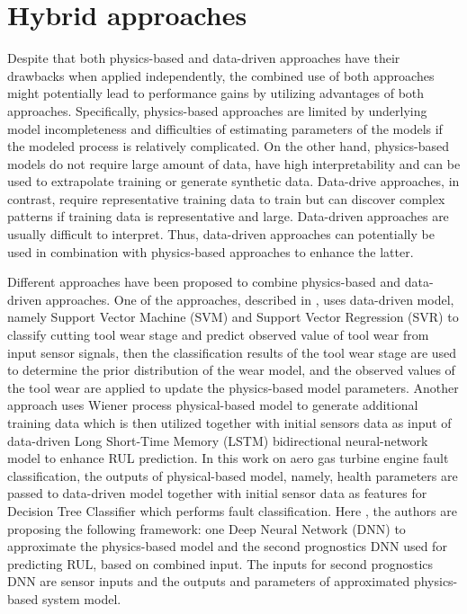 \section{Hybrid approaches}
Despite that both physics-based and data-driven approaches have their drawbacks when applied independently, the combined use of both approaches might potentially lead to performance gains by utilizing advantages of both approaches.  Specifically, physics-based approaches are limited by underlying model incompleteness and difficulties of estimating parameters of the models if the modeled process is relatively complicated. On the other hand, physics-based models do not require large amount of data, have high interpretability and can be used to extrapolate training or generate synthetic data.  
Data-drive approaches, in contrast, require representative training data to train but can discover complex patterns if training data is representative and large. Data-driven approaches are usually difficult to interpret. Thus, data-driven approaches can potentially be used in combination with physics-based approaches to enhance the latter.  

Different approaches have been proposed to combine physics-based and data-driven approaches. One of the approaches, described in \cite{Li2022} , uses data-driven model, namely Support Vector Machine (SVM) and Support Vector Regression (SVR) to classify cutting tool wear stage and predict observed value of tool wear from input sensor signals, then the classification results of the tool wear stage are used to determine the prior distribution of the wear model, and the observed values of the tool
wear are applied to update the physics-based model parameters.
Another approach \cite{Liu20207848} uses Wiener process physical-based model to generate additional training data which is then utilized together with initial sensors data  as input of data-driven Long Short-Time Memory (LSTM) bidirectional neural-network model to enhance RUL prediction.  
In this work \cite{KIM2023108102} on aero gas turbine engine fault classification, the outputs of physical-based model, namely, health parameters are passed to data-driven model together with initial sensor data as features for Decision Tree Classifier which performs fault classification.  
Here \cite{Chao2020}, the authors are proposing the following framework: one Deep Neural Network (DNN) to approximate the physics-based model and the second prognostics DNN used for predicting RUL, based on combined input. The inputs for second prognostics DNN are sensor inputs and the outputs and parameters of approximated physics-based system model.
